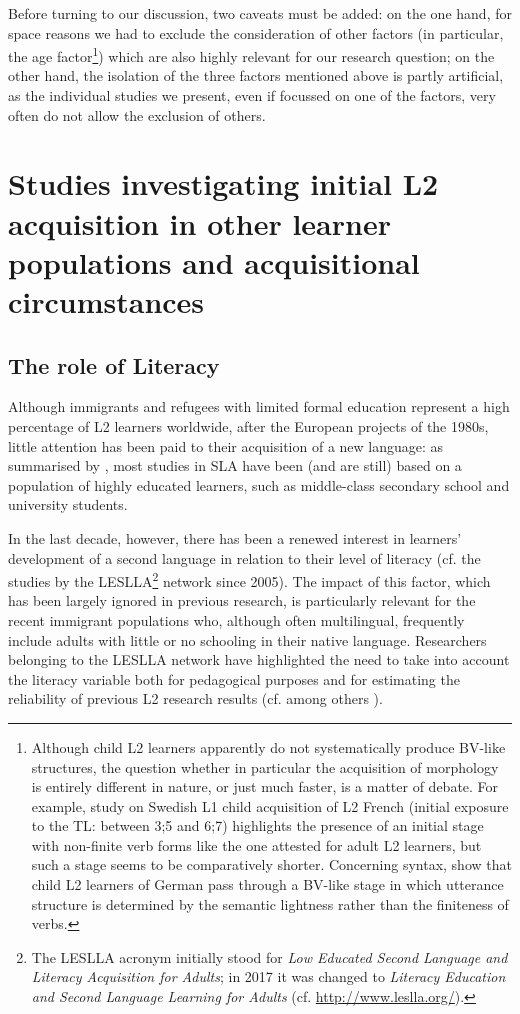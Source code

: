 \documentclass[output=paper]{langscibook}
\begin{document}
Before turning to our discussion, two caveats must be added: on the one hand, for space reasons we had to exclude the consideration of other factors (in particular, the age factor\footnote{Although child L2 learners apparently do not systematically produce BV-like structures, the question whether in particular the acquisition of morphology is entirely different in nature, or just much faster, is a matter of debate. For example,  study on Swedish L1 child acquisition of L2 French (initial exposure to the TL: between 3;5 and 6;7) highlights the presence of an initial stage with non-finite verb forms like the one attested for adult L2 learners, but such a stage seems to be comparatively shorter. Concerning syntax, \citet{SchimkeDimroth2018} show that child L2 learners of German pass through a BV-like stage in which utterance structure is determined by the semantic lightness rather than the finiteness of verbs.}) which are also highly relevant for our research question; on the other hand, the isolation of the three factors mentioned above is partly artificial, as the individual studies we present, even if focussed on one of the factors, very often do not allow the exclusion of others.

\section{Studies investigating initial L2 acquisition in other learner populations and acquisitional circumstances}\label{sec:benazzo:4}
\subsection{The role of Literacy}\label{sec:benazzo:4.1}

Although immigrants and refugees with limited formal education represent a high percentage of L2 learners worldwide, after the European projects of the 1980s, little attention has been paid to their acquisition of a new language: as summarised by \citet{Young-Scholten2013}, most studies in SLA have been (and are still) based on a population of highly educated learners, such as middle-class secondary school and university students. 

In the last decade, however, there has been a renewed interest in learners’ development of a second language in relation to their level of literacy (cf. the studies by the LESLLA\footnote{The LESLLA acronym initially stood for \textit{Low Educated Second Language and Literacy Acquisition for Adults}; in 2017 it was changed to \textit{Literacy Education and Second Language Learning for Adults} (cf. \url{http://www.leslla.org/}).} network since 2005). The impact of this factor, which has been largely ignored in previous research, is particularly relevant for the recent immigrant populations who, although often multilingual, frequently include adults with little or no schooling in their native language. Researchers belonging to the LESLLA network have highlighted the need to take into account the literacy variable both for pedagogical purposes and for estimating the reliability of previous L2 research results (cf. among others \citealt{vandeCraatsEtAl2006, Young-Scholten2013, Tarone2014}). 
\end{document}
